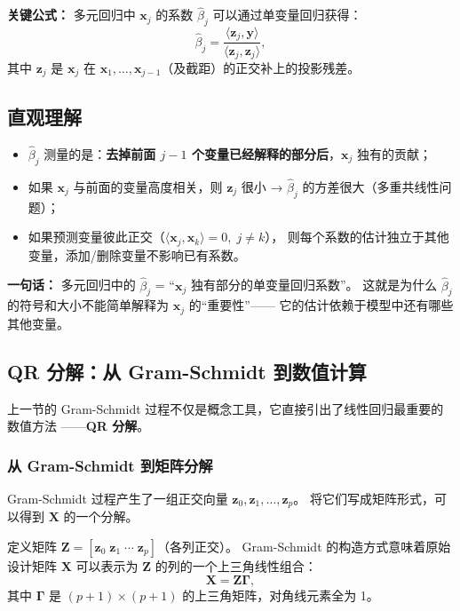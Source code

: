 \medskip
\noindent
\textbf{关键公式：} 多元回归中 $\mathbf{x}_j$ 的系数 $\hat{\beta}_j$ 可以通过单变量回归获得：
\begin{equation}\label{eq:gs_coef}
    \boxed{\hat{\beta}_j = \frac{\langle \mathbf{z}_j, \mathbf{y} \rangle}{\langle \mathbf{z}_j, \mathbf{z}_j \rangle}},
\end{equation}
其中 $\mathbf{z}_j$ 是 $\mathbf{x}_j$ 在 $\mathbf{x}_1, \dots, \mathbf{x}_{j-1}$（及截距）的正交补上的投影残差。

\subsection{直观理解}

\begin{itemize}
    \item $\hat{\beta}_j$ 测量的是：\textbf{去掉前面 $j-1$ 个变量已经解释的部分后}，$\mathbf{x}_j$ 独有的贡献；
    \item 如果 $\mathbf{x}_j$ 与前面的变量高度相关，则 $\mathbf{z}_j$ 很小 → $\hat{\beta}_j$ 的方差很大（多重共线性问题）；
    \item 如果预测变量彼此正交（$\langle \mathbf{x}_j, \mathbf{x}_k \rangle = 0,\; j \neq k$），
    则每个系数的估计独立于其他变量，添加/删除变量不影响已有系数。
\end{itemize}

\textbf{一句话：} 多元回归中的 $\hat{\beta}_j$ = ``$\mathbf{x}_j$ 独有部分的单变量回归系数''。
这就是为什么 $\hat{\beta}_j$ 的符号和大小不能简单解释为 $\mathbf{x}_j$ 的``重要性''——
它的估计依赖于模型中还有哪些其他变量。

\subsection{QR 分解：从 Gram-Schmidt 到数值计算}

上一节的 Gram-Schmidt 过程不仅是概念工具，它直接引出了线性回归最重要的数值方法
——\textbf{QR 分解}。

\subsubsection{从 Gram-Schmidt 到矩阵分解}

Gram-Schmidt 过程产生了一组正交向量 $\mathbf{z}_0, \mathbf{z}_1, \dots, \mathbf{z}_p$。
将它们写成矩阵形式，可以得到 $\mathbf{X}$ 的一个分解。

定义矩阵 $\mathbf{Z} = [\mathbf{z}_0 \; \mathbf{z}_1 \; \cdots \; \mathbf{z}_p]$（各列正交）。
Gram-Schmidt 的构造方式意味着原始设计矩阵 $\mathbf{X}$ 可以表示为 $\mathbf{Z}$ 的列的一个上三角线性组合：
\begin{equation}\label{eq:X_to_Z}
    \mathbf{X} = \mathbf{Z} \bm{\Gamma},
\end{equation}
其中 $\bm{\Gamma}$ 是 $(p+1) \times (p+1)$ 的上三角矩阵，对角线元素全为 1。

